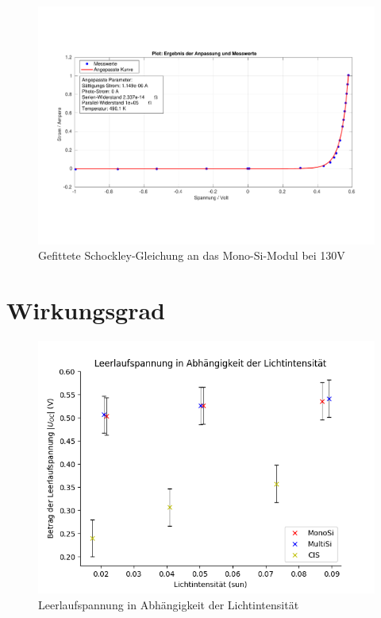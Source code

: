 \begin{figure}[ht]
    \centering
    \includegraphics[width = \linewidth]{Bilder/SiMultiDunkelPlot.pdf}
    \caption{Gefittete Schockley-Gleichung an das Mono-Si-Modul bei 130V}
\end{figure}
\clearpage

\section{Wirkungsgrad}
\label{section:AnhangWirkungsgrad}

\begin{figure}[ht]
    \centering
    \includegraphics[width = \linewidth]{Bilder/PlotLeerlaufspannugnInt.png}
    \caption{Leerlaufspannung in Abhängigkeit der Lichtintensität}
\end{figure}

